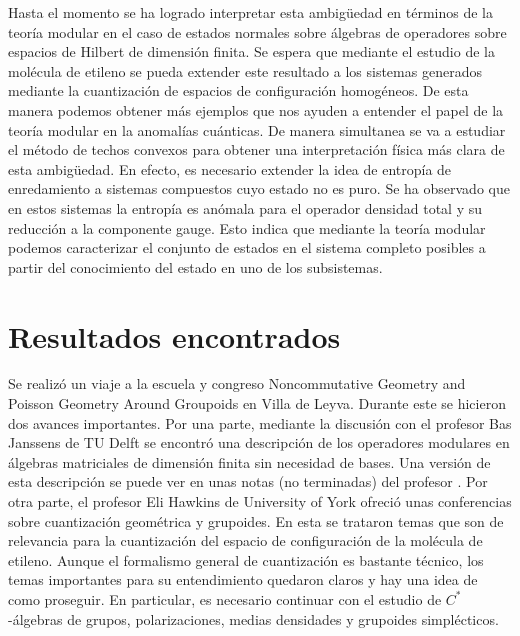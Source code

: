 \documentclass{article}
\begin{document}
Hasta el momento se ha logrado interpretar esta ambigüedad en términos de la teoría modular en el caso de estados normales sobre álgebras de operadores sobre espacios de Hilbert de dimensión finita. Se espera que mediante el estudio de la molécula de etileno\cite{Balachandran2013a} se pueda extender este resultado a los sistemas generados mediante la cuantización de espacios de configuración homogéneos. De esta manera podemos obtener más ejemplos que nos ayuden a entender el papel de la teoría modular en la anomalías cuánticas. De manera simultanea se va a estudiar el método de techos convexos para obtener una interpretación física más clara de esta ambigüedad\cite{Uhlmann2010}. En efecto, es necesario extender la idea de entropía de enredamiento a sistemas compuestos cuyo estado no es puro. Se ha observado que en estos sistemas la entropía es anómala para el operador densidad total y su reducción a la componente gauge. Esto indica que mediante la teoría modular podemos caracterizar el conjunto de estados en el sistema completo posibles a partir del conocimiento del estado en uno de los subsistemas.

\section{Resultados encontrados}

Se realizó un viaje a la escuela y congreso Noncommutative Geometry and Poisson Geometry Around Groupoids en Villa de Leyva. Durante este se hicieron dos avances importantes. Por una parte, mediante la discusión con el profesor Bas Janssens de TU Delft se encontró una descripción de los operadores modulares en álgebras matriciales de dimensión finita sin necesidad de bases. Una versión de esta descripción se puede ver en unas notas (no terminadas) del profesor \cite{Janssens2013}. Por otra parte, el profesor Eli Hawkins de University of York ofreció unas conferencias sobre cuantización geométrica y grupoides. En esta se trataron temas que son de relevancia para la cuantización del espacio de configuración de la molécula de etileno. Aunque el formalismo general de cuantización es bastante técnico, los temas importantes para su entendimiento quedaron claros y hay una idea de como proseguir.  En particular, es necesario continuar con el estudio de $C^*$-álgebras de grupos, polarizaciones, medias densidades y grupoides simplécticos.
\end{document}
